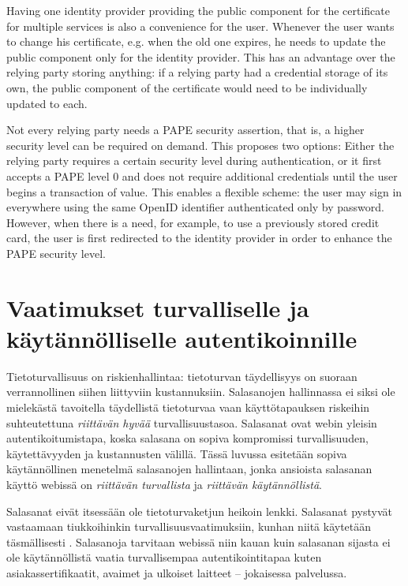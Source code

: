 \documentclass[english,gradu]{tktltiki}
\begin{document}
      Having one identity provider providing the public component for the certificate for multiple services is also a convenience for the user. Whenever the user wants to change his certificate, e.g. when the old one expires, he needs to update the public component only for the identity provider. This has an advantage over the relying party storing anything: if a relying party had a credential storage of its own, the public component of the certificate would need to be individually updated to each.

      Not every relying party needs a PAPE security assertion, that is, a higher security level can be required on demand. This proposes two options: Either the relying party requires a certain security level during authentication, or it first accepts a PAPE level 0 and does not require additional credentials until the user begins a transaction of value. This enables a flexible scheme: the user may sign in everywhere using the same OpenID identifier authenticated only by password. However, when there is a need, for example, to use a previously stored credit card, the user is first redirected to the identity provider in order to enhance the PAPE security level.



\section{Vaatimukset turvalliselle ja käytännölliselle autentikoinnille} %
\label{sec:autentikoituminen_turvallisesti_ja_käytännöllisesti}

Tietoturvallisuus on riskienhallintaa: tietoturvan täydellisyys on suoraan verrannollinen siihen liittyviin kustannuksiin. Salasanojen hallinnassa ei siksi ole mielekästä tavoitella täydellistä tietoturvaa vaan käyttötapauksen riskeihin suhteutettuna \emph{riittävän hyvää} turvallisuustasoa. Salasanat ovat webin yleisin autentikoitumistapa, koska salasana on sopiva kompromissi turvallisuuden, käytettävyyden ja kustannusten välillä. Tässä luvussa esitetään sopiva käytännöllinen menetelmä salasanojen hallintaan, jonka ansioista salasanan käyttö webissä on \emph{riittävän turvallista} ja \emph{riittävän käytännöllistä}.

Salasanat eivät itsessään ole tietoturvaketjun heikoin lenkki. Salasanat pystyvät vastaamaan tiukkoihinkin turvallisuusvaatimuksiin, kunhan niitä käytetään täsmällisesti \cite{will_we_ever_escape_passwords_05}. Salasanoja tarvitaan webissä niin kauan kuin salasanan sijasta ei ole käytännöllistä vaatia turvallisempaa autentikointitapaa kuten asiakassertifikaatit, avaimet ja ulkoiset laitteet -- jokaisessa palvelussa.
\end{document}
